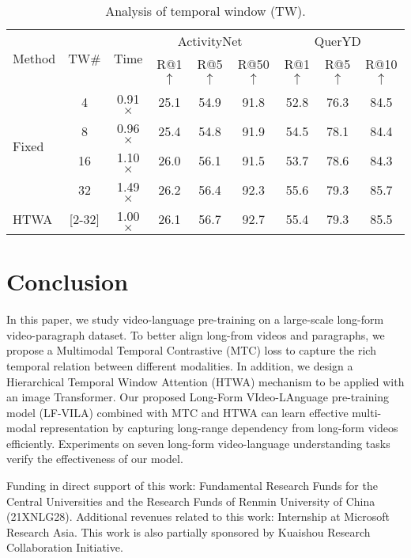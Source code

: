\documentclass{article}
\begin{document}
\begin{table}[h!]
    \small
    \centering
    \caption{Analysis of temporal window (TW).}
    \begin{tabular}{l  c  c c c c c c c} 
    \toprule
    \multirow{2}{*}{Method}&\multirow{2}{*}{TW\#}&\multirow{2}{*}{Time}&\multicolumn{3}{c}{ActivityNet~\cite{krishna2017actnetcaption}} & \multicolumn{3}{c}{QuerYD~\cite{oncescu2021queryd}} \\
     \cmidrule{4-9}
    & & & R@1$\uparrow$ & R@5$\uparrow$ & R@50$\uparrow$ &R@1$\uparrow$ & R@5$\uparrow$ & R@10$\uparrow$ \\
    \cmidrule{1-9}
    \multirow{4}{*}{Fixed} 
    &4 &0.91$\times$ &25.1 &54.9 & 91.8 &52.8 &76.3 &84.5 \\
    &8 &0.96$\times$ &25.4 & 54.8 & 91.9 &54.5 &78.1 &84.4 \\
    &16 &1.10$\times$ &26.0 & 56.1 & 91.5 &53.7 &78.6 &84.3 \\
    &32 &1.49$\times$ &26.2 & 56.4 & 92.3 &55.6 &79.3 &85.7 \\
    \cmidrule{1-9}
    HTWA  &[2-32] &1.00$\times$ & 26.1 & 56.7 &92.7 &55.4 &79.3 &85.5\\ 

    \bottomrule
    \end{tabular}
    \label{tab:abl_window}
\end{table}
 \section{Conclusion}
\label{conclusion}
In this paper, we study video-language pre-training on a large-scale long-form video-paragraph dataset.
To better align long-from videos and paragraphs, we propose a Multimodal Temporal Contrastive (MTC) loss to capture the rich temporal relation between different modalities.
In addition, we design a Hierarchical Temporal Window Attention (HTWA) mechanism to be applied with an image Transformer. Our proposed Long-Form VIdeo-LAnguage pre-training model (LF-VILA) combined with MTC and HTWA can learn effective multi-modal representation by capturing long-range dependency from long-form videos efficiently.
Experiments on seven long-form video-language understanding tasks verify the effectiveness of our model. 
\begin{ack}
Funding in direct support of this work: Fundamental Research Funds for the Central Universities and the Research Funds of Renmin University of China (21XNLG28). Additional revenues related to this work: Internship at Microsoft Research Asia. This work is also partially sponsored by Kuaishou  Research Collaboration Initiative.
\end{ack}
\end{document}
